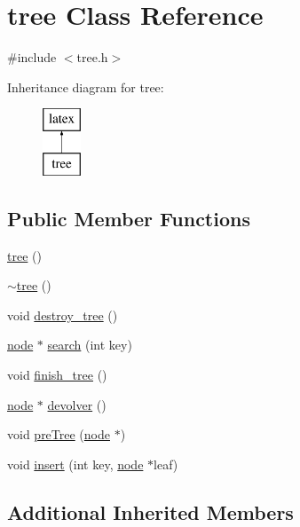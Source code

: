 \hypertarget{classtree}{\section{tree Class Reference}
\label{classtree}
}


{\ttfamily \#include $<$tree.\-h$>$}

Inheritance diagram for tree\-:\begin{figure}[H]
\begin{center}
\leavevmode
\includegraphics[height=2.000000cm]{classtree}
\end{center}
\end{figure}
\subsection*{Public Member Functions}
\begin{DoxyCompactItemize}
\item 
\hyperlink{classtree_a9f2a566ac2710fafc31232456780e82d}{tree} ()
\item 
\hyperlink{classtree_a05f3faa3c9a8f6fed237e2d0f6172244}{$\sim$tree} ()
\item 
void \hyperlink{classtree_a523172b004801388b1e6920d6d984347}{destroy\-\_\-tree} ()
\item 
\hyperlink{structnode}{node} $\ast$ \hyperlink{classtree_a9a4e341c78d3559e5f6e3b0060530f05}{search} (int key)
\item 
void \hyperlink{classtree_a86bf515529211e7f7d1f18892bf6fff5}{finish\-\_\-tree} ()
\item 
\hyperlink{structnode}{node} $\ast$ \hyperlink{classtree_a8f8b30a2baf52a6caaef83b4d1f6437c}{devolver} ()
\item 
void \hyperlink{classtree_a0ef6ed05374416b539704bb736d6095b}{pre\-Tree} (\hyperlink{structnode}{node} $\ast$)
\item 
void \hyperlink{classtree_ad89fe5887fac5a2fec7ae8c05154bb64}{insert} (int key, \hyperlink{structnode}{node} $\ast$leaf)
\end{DoxyCompactItemize}
\subsection*{Additional Inherited Members}


